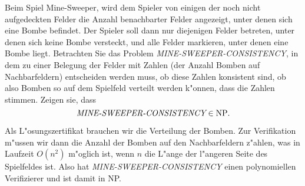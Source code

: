 Beim Spiel Mine-Sweeper, wird dem Spieler von einigen der noch nicht
aufgedeckten Felder die Anzahl benachbarter Felder angezeigt, unter
denen sich eine Bombe befindet. Der Spieler soll dann nur diejenigen
Felder betreten, unter denen sich keine Bombe versteckt, und alle
Felder markieren, unter denen eine Bombe liegt. Betrachten Sie das
Problem {\it MINE-SWEEPER-CONSISTENCY}, in dem zu einer Belegung der
Felder mit Zahlen (der Anzahl Bomben auf Nachbarfeldern) entscheiden
werden muss, ob diese Zahlen konsistent sind, ob also Bomben so
auf dem Spielfeld verteilt werden k"onnen, dass die Zahlen stimmen.
Zeigen sie, dass
\[
\text{\it MINE-SWEEPER-CONSISTENCY}\in \text{NP}.
\]

\begin{loesung}
Als L"osungszertifikat brauchen wir die Verteilung der Bomben.
Zur Verifikation m"ussen wir dann die Anzahl der Bomben auf den
Nachbarfeldern z"ahlen, was in Laufzeit $O(n^2)$ m"oglich ist,
wenn $n$ die L"ange der l"angeren Seite des Spielfeldes ist.
Also hat
{\it MINE-SWEEPER-CONSISTENCY} einen polynomiellen Verifizierer und
ist damit in NP.
\end{loesung}
